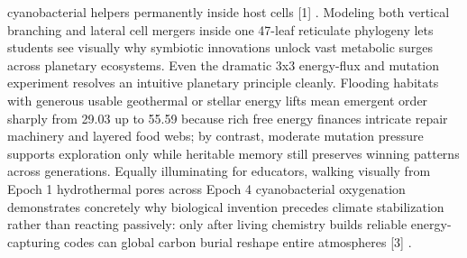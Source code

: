 \documentclass[10pt,letterpaper]{article}
\begin{document}
cyanobacterial helpers permanently inside host cells [1] . Modeling both vertical branching and lateral cell mergers inside one 47-leaf reticulate phylogeny lets students see visually why symbiotic innovations unlock vast metabolic surges across planetary ecosystems. Even the dramatic 3x3 energy-flux and mutation experiment resolves an intuitive planetary principle cleanly. Flooding habitats with generous usable geothermal or stellar energy lifts mean emergent order sharply from 29.03 up to 55.59 because rich free energy finances intricate repair machinery and layered food webs; by contrast, moderate mutation pressure supports exploration only while heritable memory still preserves winning patterns across generations. Equally illuminating for educators, walking visually from Epoch 1 hydrothermal pores across Epoch 4 cyanobacterial oxygenation demonstrates concretely why biological invention precedes climate stabilization rather than reacting passively: only after living chemistry builds reliable energy-capturing codes can global carbon burial reshape entire atmospheres [3] .
\end{document}
